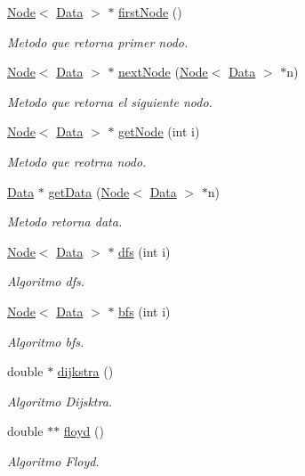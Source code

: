 \begin{DoxyCompactItemize}
\hyperlink{class_node}{Node}$<$ \hyperlink{class_data}{Data} $>$ $\ast$ \hyperlink{class_graph_ad62cffbfcc756ee7c9d02294ab5250f6}{first\+Node} ()
\begin{DoxyCompactList}\small\item\em Metodo que retorna primer nodo. \end{DoxyCompactList}\item 
\hyperlink{class_node}{Node}$<$ \hyperlink{class_data}{Data} $>$ $\ast$ \hyperlink{class_graph_a437e5d7af67aa694662f4771fb09389a}{next\+Node} (\hyperlink{class_node}{Node}$<$ \hyperlink{class_data}{Data} $>$ $\ast$n)
\begin{DoxyCompactList}\small\item\em Metodo que retorna el siguiente nodo. \end{DoxyCompactList}\item 
\hyperlink{class_node}{Node}$<$ \hyperlink{class_data}{Data} $>$ $\ast$ \hyperlink{class_graph_ae9cac0cd09984cf19e6f2727c519b5ec}{get\+Node} (int i)
\begin{DoxyCompactList}\small\item\em Metodo que reotrna nodo. \end{DoxyCompactList}\item 
\hyperlink{class_data}{Data} $\ast$ \hyperlink{class_graph_aea0299a50d31f377264ad0c5b6763851}{get\+Data} (\hyperlink{class_node}{Node}$<$ \hyperlink{class_data}{Data} $>$ $\ast$n)
\begin{DoxyCompactList}\small\item\em Metodo retorna data. \end{DoxyCompactList}\item 
\hyperlink{class_node}{Node}$<$ \hyperlink{class_data}{Data} $>$ $\ast$ \hyperlink{class_graph_a48cfc6240bc62c2d8383611c0c802a95}{dfs} (int i)
\begin{DoxyCompactList}\small\item\em Algoritmo dfs. \end{DoxyCompactList}\item 
\hyperlink{class_node}{Node}$<$ \hyperlink{class_data}{Data} $>$ $\ast$ \hyperlink{class_graph_ae366957a73bb817a42fa1af60ffd3d06}{bfs} (int i)
\begin{DoxyCompactList}\small\item\em Algoritmo bfs. \end{DoxyCompactList}\item 
double $\ast$ \hyperlink{class_graph_a8948b09a3892f77f1a3645f104ced594}{dijkstra} ()
\begin{DoxyCompactList}\small\item\em Algoritmo Dijsktra. \end{DoxyCompactList}\item 
double $\ast$$\ast$ \hyperlink{class_graph_a159efcb9312762a6e170524c7d298e9c}{floyd} ()
\begin{DoxyCompactList}\small\item\em Algoritmo Floyd. \end{DoxyCompactList}\end{DoxyCompactItemize}
